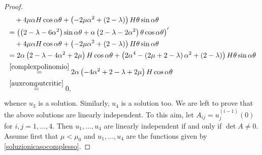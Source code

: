 \documentclass[10pt,a4paper]{amsart}
\begin{document}
\begin{proof}
\begin{equation*}
\begin{split}
	&\quad+4\mu\alpha H\cos\alpha\theta+\left(-2\mu\alpha^2 +(2-\lambda)\right)H\theta\sin\alpha\theta\\
	&=\left(\left(2-\lambda-6\alpha^2\right)\sin\alpha\theta+\alpha\left(2-\lambda-2\alpha^2\right)\theta\cos\alpha\theta\right)'\\
	&\quad+4\mu\alpha H\cos\alpha\theta+\left(-2\mu\alpha^2 +(2-\lambda)\right)H\theta\sin\alpha\theta\\
	&=2\alpha\left(2-\lambda-4\alpha^2+2\mu\right)H\cos\alpha\theta+\left(2\alpha^4-\left(2\mu+2-\lambda\right)\alpha^2+(2-\lambda)\right)H\theta\sin\alpha\theta\\
	&\overset{\eqref{complexpolinomio}}{=}2\alpha\left(-4\alpha^2+2-\lambda+2\mu\right)H\cos\alpha\theta\\
	&\overset{\eqref{auxcomputcritic}}{=}0,
\end{split}
\end{equation*}
whence $u_3$ is a solution. Similarly,  $u_4$ is a solution too.     
We are left to prove that the above solutions are linearly independent. To this aim, let $A_{ij}=u^{(i-1)}_j(0)$ for $i,j=1,\ldots,4$. Then $u_1,\ldots,u_4$ are linearly independent if and only if $\det A\neq 0$. 
Assume first that $\mu<\mu_0$ and $u_1,\ldots,u_4$ are the functions given by \eqref{soluzionicasocomplesso}.

\end{proof}
\end{document}
